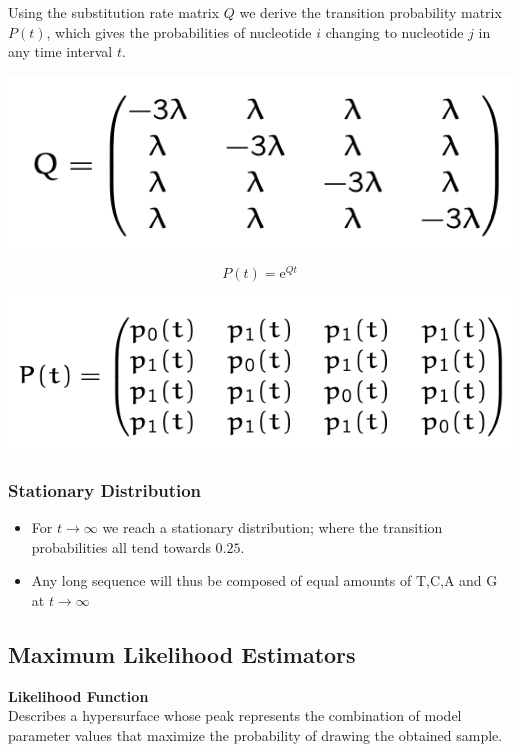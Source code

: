 \documentclass{article}
\begin{document}
\begin{multicols*}{3}
Using the substitution rate matrix $Q$ we derive the transition probability matrix $P(t)$, which gives the probabilities of nucleotide $i$ changing to nucleotide $j$ in any time interval $t$.

\begin{center}
    \includegraphics[width=0.5\linewidth]{substitutionratematrix.png}
\end{center}

$$P(t) = \text{e}^{Qt}$$

\begin{center}
    \includegraphics[width=0.7\linewidth]{transitionprobabilitymatrix.png}
\end{center}

\subsubsection{Stationary Distribution}

\begin{itemize}
    \item For $t \rightarrow \infty$ we reach a stationary distribution; where the transition probabilities all tend towards $0.25$. 
    \item Any long sequence will thus be composed of equal amounts of T,C,A and G at $t \rightarrow \infty$
\end{itemize}

\subsection{Maximum Likelihood Estimators}
\begin{mdframed}[backgroundcolor=astral] 
    \textbf{Likelihood Function}\\
    Describes a hypersurface whose peak represents the combination of model parameter values that maximize the probability of drawing the obtained sample. 
\end{mdframed}


\end{multicols*}
\end{document}
